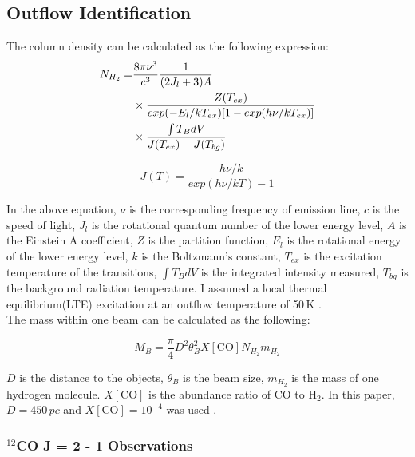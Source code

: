 \documentclass[twoside,11pt]{gshs_thesis}
\begin{document}
\subsection{Outflow Identification}

The column density can be calculated as the following expression:
\begin{align}
N_{H_2} =& \frac{8\pi \nu^3}{c^3} \frac{1}{(2J_l +3)A}  \notag \\
& \times \frac{Z(T_{ex})}{exp(-E_l / kT_{ex})[1-exp(h\nu / kT_{ex})]} \notag \\
& \times \frac{\int T_B dV}{J(T_{ex})-J(T_{bg})}
\end{align}

\begin{equation}
	J(T) = \frac{h \nu / k}{exp(h\nu / kT)-1}
\end{equation}

In the above equation, $\nu$ is the corresponding frequency of emission line, $c$ is the speed of light, $J_l$ is the rotational quantum number of the lower energy level, $A$ is the Einstein A coefficient, $Z$ is the partition function, $E_l$ is the rotational energy of the lower energy level, $k$ is the Boltzmann's constant, $T_{ex}$ is the excitation temperature of the transitions, $\int T_B dV$ is the integrated intensity measured, $T_{bg}$ is the background radiation temperature. I assumed a local thermal equilibrium(LTE) excitation at an outflow temperature of 50$\,$K \cite{Takahashi}.\\

The mass within one beam can be calculated as the following:

\begin{equation}
M_B =  \frac{\pi}{4} D^2 \theta_B ^2 X[\textrm{CO}] N_{H_2} m_{H_2}
\end{equation}

$D$ is the distance to the objects, $\theta_B$ is the beam size, $m_{H_2}$ is the mass of one hydrogen molecule. $X[\textrm{CO}]$ is the abundance ratio of CO to $\textrm{H}_2$. In this paper, $D = 450\,pc$ and $X[\textrm{CO}] = 10^{-4}$ was used \cite{Hatchell2}.\\



\subsubsection{$^{12}$CO J = 2 - 1 Observations}
\end{document}

